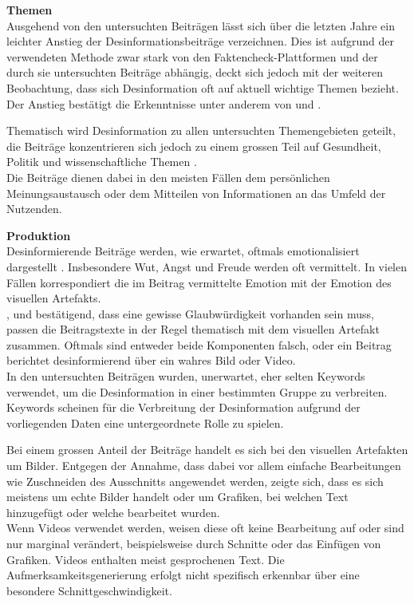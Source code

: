\documentclass[12pt,a4paper]{article}        %
\begin{document}
\textbf{Themen}\\
Ausgehend von den untersuchten Beiträgen lässt sich über die letzten Jahre ein leichter Anstieg der Desinformationsbeiträge verzeichnen. Dies ist aufgrund der verwendeten Methode zwar stark von den Faktencheck-Plattformen und der durch sie untersuchten Beiträge abhängig, deckt sich jedoch mit der weiteren Beobachtung, dass sich Desinformation oft auf aktuell wichtige Themen bezieht. Der Anstieg bestätigt die Erkenntnisse unter anderem von \textcite{khan_fake_2021} und \textcite[26]{vogler_wahrnehmung_2021}.

Thematisch wird Desinformation zu allen untersuchten Themengebieten geteilt, die Beiträge konzentrieren sich jedoch zu einem grossen Teil auf Gesundheit, Politik und wissenschaftliche Themen \parencite[vgl.\ dazu ][2]{ceron_fake_2021}.\\
Die Beiträge dienen dabei in den meisten Fällen dem persönlichen Meinungsaustausch oder dem Mitteilen von Informationen an das Umfeld der Nutzenden.

\textbf{Produktion}\\
Desinformierende Beiträge werden, wie erwartet, oftmals emotionalisiert dargestellt \parencites[vgl.\ dazu][3703]{weikmann_visual_2023}[146]{teixeira_emotion-induced_2012}[23]{zhou_effects_2005}. Insbesondere Wut, Angst und Freude werden oft vermittelt. In vielen Fällen korrespondiert die im Beitrag vermittelte Emotion mit der Emotion des visuellen Artefakts.\\
\textcite[Pennycook et al. (2018), zit\ nach][182]{weidner_fake_2019}, \textcite[15]{bradshaw_industrialized_2021} und \textcite[3700]{weikmann_visual_2023} bestätigend, dass eine gewisse Glaubwürdigkeit vorhanden sein muss, passen die Beitragstexte in der Regel thematisch mit dem visuellen Artefakt zusammen. Oftmals sind entweder beide Komponenten falsch, oder ein Beitrag berichtet desinformierend über ein wahres Bild oder Video.\\
In den untersuchten Beiträgen wurden, unerwartet, eher selten Keywords verwendet, um die Desinformation in einer bestimmten Gruppe zu verbreiten. Keywords scheinen für die Verbreitung der Desinformation aufgrund der vorliegenden Daten eine untergeordnete Rolle zu spielen.

Bei einem grossen Anteil der Beiträge handelt es sich bei den visuellen Artefakten um Bilder. Entgegen der Annahme, dass dabei vor allem einfache Bearbeitungen wie Zuschneiden des Ausschnitts angewendet werden, zeigte sich, dass es sich meistens um echte Bilder handelt oder um Grafiken, bei welchen Text hinzugefügt oder welche bearbeitet wurden.\\
Wenn Videos verwendet werden, weisen diese oft keine Bearbeitung auf oder sind nur marginal verändert, beispielsweise durch Schnitte oder das Einfügen von Grafiken. Videos enthalten meist gesprochenen Text. Die Aufmerksamkeitsgenerierung erfolgt nicht spezifisch erkennbar über eine besondere Schnittgeschwindigkeit.
\end{document}
